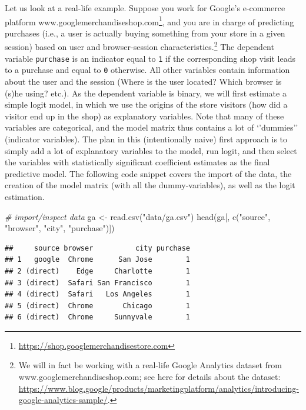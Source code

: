 \documentclass[
  12pt,
]{style/krantz}
\newenvironment{Shaded}{\begin{snugshade}}{\end{snugshade}}
\newcommand{\CommentTok}[1]{\textcolor[rgb]{0.56,0.35,0.01}{\textit{#1}}}
\newcommand{\FunctionTok}[1]{\textcolor[rgb]{0.00,0.00,0.00}{#1}}
\newcommand{\NormalTok}[1]{#1}
\newcommand{\OtherTok}[1]{\textcolor[rgb]{0.56,0.35,0.01}{#1}}
\newcommand{\StringTok}[1]{\textcolor[rgb]{0.31,0.60,0.02}{#1}}
\renewcommand{\href}[2]{#2\footnote{\url{#1}}}
\begin{document}
Let us look at a real-life example. Suppose you work for Google's e-commerce platform \href{https://shop.googlemerchandisestore.com}{www.googlemerchandiseshop.com}, and you are in charge of predicting purchases (i.e., a user is actually buying something from your store in a given session) based on user and browser-session characteristics.\footnote{We will in fact be working with a real-life Google Analytics dataset from www.googlemerchandiseshop.com; see here for details about the dataset: \url{https://www.blog.google/products/marketingplatform/analytics/introducing-google-analytics-sample/}.} The dependent variable \texttt{purchase} is an indicator equal to \texttt{1} if the corresponding shop visit leads to a purchase and equal to \texttt{0} otherwise. All other variables contain information about the user and the session (Where is the user located? Which browser is (s)he using? etc.). As the dependent variable is binary, we will first estimate a simple logit model, in which we use the origins of the store visitors (how did a visitor end up in the shop) as explanatory variables. Note that many of these variables are categorical, and the model matrix thus contains a lot of `'dummies'' (indicator variables). The plan in this (intentionally naive) first approach is to simply add a lot of explanatory variables to the model, run logit, and then select the variables with statistically significant coefficient estimates as the final predictive model. The following code snippet covers the import of the data, the creation of the model matrix (with all the dummy-variables), as well as the logit estimation.

\begin{Shaded}
\begin{Highlighting}[]
\CommentTok{\# import/inspect data}
\NormalTok{ga }\OtherTok{\textless{}{-}} \FunctionTok{read.csv}\NormalTok{(}\StringTok{"data/ga.csv"}\NormalTok{)}
\FunctionTok{head}\NormalTok{(ga[, }\FunctionTok{c}\NormalTok{(}\StringTok{"source"}\NormalTok{, }\StringTok{"browser"}\NormalTok{, }\StringTok{"city"}\NormalTok{, }\StringTok{"purchase"}\NormalTok{)])}
\end{Highlighting}
\end{Shaded}

\begin{verbatim}
##     source browser          city purchase
## 1   google  Chrome      San Jose        1
## 2 (direct)    Edge     Charlotte        1
## 3 (direct)  Safari San Francisco        1
## 4 (direct)  Safari   Los Angeles        1
## 5 (direct)  Chrome       Chicago        1
## 6 (direct)  Chrome     Sunnyvale        1
\end{verbatim}
\end{document}
